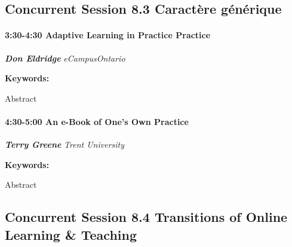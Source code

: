 \documentclass[
]{book}
\begin{document}
\hypertarget{concurrent-session-8.3-wildcard}{%
\subsection*{Concurrent Session 8.3 \textbar{} Caractère générique}\label{concurrent-session-8.3-wildcard}}

\begin{session}
\hypertarget{adaptive-learning-in-practice-practice}{%
\paragraph*{\texorpdfstring{3:30-4:30 \textbar{} \textbf{Adaptive
Learning in Practice} \textbar{}
Practice}{3:30-4:30 \textbar{} Adaptive Learning in Practice \textbar{} Practice}}\label{adaptive-learning-in-practice-practice}}

\textbf{\emph{Don Eldridge}} \textbar{} \emph{eCampusOntario}

\textbf{Keywords:}

Abstract
\end{session}

\begin{session}
\hypertarget{an-e-book-of-ones-own-practice}{%
\paragraph*{\texorpdfstring{4:30-5:00 \textbar{} \textbf{An e-Book of
One's Own} \textbar{}
Practice}{4:30-5:00 \textbar{} An e-Book of One's Own \textbar{} Practice}}\label{an-e-book-of-ones-own-practice}}

\textbf{\emph{Terry Greene}} \textbar{} \emph{Trent University}

\textbf{Keywords:}

Abstract
\end{session}

\hypertarget{concurrent-session-8.4-transitions-of-online-learning-teaching}{%
\subsection*{Concurrent Session 8.4 \textbar{} Transitions of Online Learning \& Teaching}\label{concurrent-session-8.4-transitions-of-online-learning-teaching}}
\end{document}
